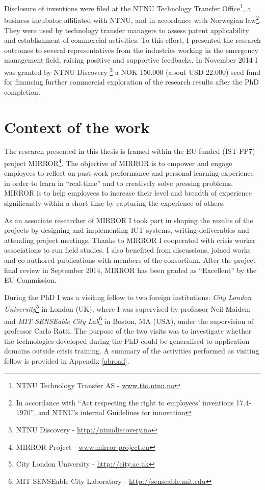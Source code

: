 Disclosure of inventions were filed at the NTNU Technology Transfer Office\footnote{NTNU Technology Transfer AS - \url{www.tto.ntnu.no}}, a business incubator affiliated with NTNU, and in accordance with Norwegian law\footnote{In accordance with ``Act respecting the right to employees' inventions 17.4-1970'', and NTNU's internal Guidelines for innovation}. They were used by technology transfer managers to assess patent applicability and establishment of commercial activities. To this effort, I presented the research outcomes to several representatives from the industries working in the emergency management field, raising positive and supportive feedbacks. In November 2014 I was granted by NTNU Discovery \footnote{NTNU Discovery - \url{http://ntnudiscovery.no}} a NOK 150.000 (about USD 22.000) seed fund for financing further commercial exploration of the research results after the PhD completion.

\section{Context of the work}\label{context-of-the-work}

The research presented in this thesis is framed within the EU-funded (IST-FP7) project MIRROR\footnote{MIRROR Project - \url{www.mirror-project.eu}}. The objective of MIRROR is to empower and engage employees to reflect on past work performance and personal learning experience in order to learn in “real-time” and to creatively solve pressing problems. MIRROR is to help employees to increase their level and breadth of experience significantly within a short time by capturing the experience of others.  

As an associate researcher of MIRROR I took part in shaping the results of the projects by designing and implementing ICT systems, writing deliverables and attending project meetings. Thanks to MIRROR I cooperated with crisis worker associations to run field studies. I also benefited from discussions, joined works and co-authored publications with members of the consortium. After the project final review in September 2014, MIRROR has been graded as ``Excellent'' by the EU Commission.

During the PhD I was a visiting fellow to two foreign institutions: \emph{City London University}\footnote{City London University - \url{http://city.ac.uk}} in London (UK), where I was supervised by professor Neil Maiden; and \emph{MIT SENSEable City Lab}\footnote{MIT SENSEable City Laboratory - \url{http://senseable.mit.edu}} in Boston, MA (USA), under the supervision of professor Carlo Ratti. The purpose of the two visits was to investigate whether the technologies developed during the PhD could be generalised to application domains outside crisis training. A summary of the activities performed as visiting fellow is provided in Appendix \ref{abroad}.

